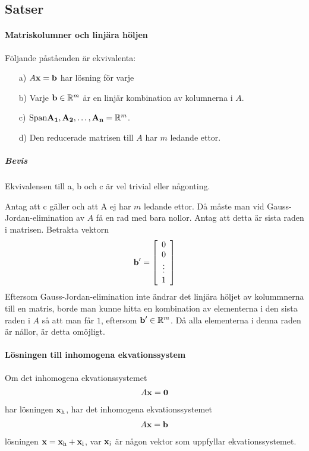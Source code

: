 \subsection{Satser}

\paragraph{Matriskolumner och linjära höljen}
Följande påståenden är ekvivalenta:
\begin{itemize}
	\item[a)] $A\vectorbold{x} = \vect{b}$ har lösning för varje
	\item[b)] Varje $\vect{b}\in \R^{m}$ är en linjär kombination av kolumnerna i $A$.
	\item[c)] $\Span{\vect{A_1}, \vect{A_2}, \dots, \vect{A_n}} = \R^m$.
	\item[d)] Den reducerade matrisen till $A$ har $m$ ledande ettor.
\end{itemize}

\subparagraph{Bevis}
Ekvivalensen till a, b och c är vel trivial eller någonting.

Antag att c gäller och att A ej har $m$ ledande ettor. Då måste man vid Gauss-Jordan-elimination av $A$ få en rad med bara nollor. Antag att detta är sista raden i matrisen. Betrakta vektorn
\begin{align*}
	\vect{b}' =
	\left[\begin{array}{c}
    	0    \\
    	0    \\
    	\vdots \\
	    1
	\end{array}\right]
\end{align*}
Eftersom Gauss-Jordan-elimination inte ändrar det linjära höljet av kolummnerna till en matris, borde man kunne hitta en kombination av elementerna i den sista raden i $A$ så att man får $1$, eftersom $\vect{b}'\in\R^m$. Då alla elementerna i denna raden är nållor, är detta omöjligt.

\paragraph{Lösningen till inhomogena ekvationssystem}
Om det inhomogena ekvationssystemet
\begin{align*}
	A\vect{x} = \vect{0}
\end{align*}
har lösningen $\vect{x}_\text{h}$, har det inhomogena ekvationssystemet
\begin{align*}
	A\vect{x} = \vect{b}
\end{align*}
lösningen $\vect{x} = \vect{x}_\text{h} + \vect{x}_\text{i}$, var $\vect{x}_\text{i}$ är någon vektor som uppfyllar ekvationssystemet.

